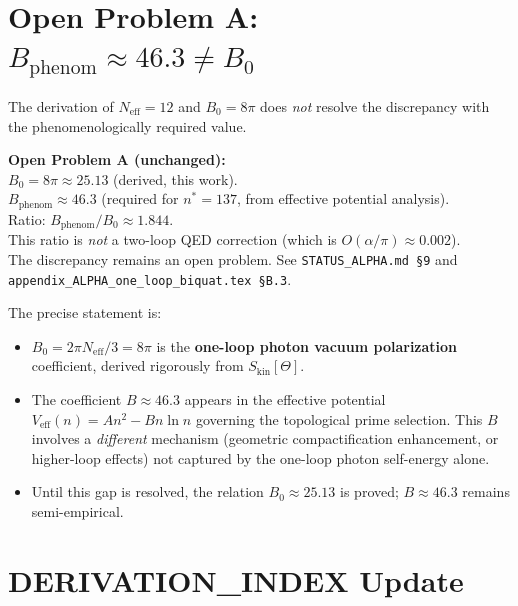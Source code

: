\documentclass[12pt,a4paper]{article}
\theoremstyle{definition}
\theoremstyle{remark}
\newcommand{\Neff}{N_{\mathrm{eff}}}
\begin{document}
\section{Open Problem A: $B_\mathrm{phenom} \approx 46.3 \neq B_0$}
\label{sec:open_problem}

The derivation of $\Neff = 12$ and $B_0 = 8\pi$ does \emph{not} resolve
the discrepancy with the phenomenologically required value.

\begin{center}
  \colorbox{openred!15}{%
    \parbox{0.88\textwidth}{%
      \textbf{Open Problem A (unchanged):}\\
      $B_0 = 8\pi \approx 25.13$ (derived, this work).\\
      $B_\mathrm{phenom} \approx 46.3$ (required for $n^* = 137$,
      from effective potential analysis).\\[4pt]
      Ratio: $B_\mathrm{phenom}/B_0 \approx 1.844$.\\[4pt]
      This ratio is \emph{not} a two-loop QED correction
      (which is $O(\alpha/\pi) \approx 0.002$).\\
      The discrepancy remains an open problem.
      See \texttt{STATUS\_ALPHA.md §9} and
      \texttt{appendix\_ALPHA\_one\_loop\_biquat.tex §B.3}.}}
\end{center}

The precise statement is:
\begin{itemize}
  \item $B_0 = 2\pi\Neff/3 = 8\pi$ is the \textbf{one-loop photon vacuum
    polarization} coefficient, derived rigorously from $S_\mathrm{kin}[\Theta]$.
  \item The coefficient $B \approx 46.3$ appears in the effective potential
    $V_\mathrm{eff}(n) = An^2 - Bn\ln n$ governing the topological prime
    selection.  This $B$ involves a \emph{different} mechanism (geometric
    compactification enhancement, or higher-loop effects) not captured by
    the one-loop photon self-energy alone.
  \item Until this gap is resolved, the relation
    $B_0 \approx 25.13$ is proved; $B \approx 46.3$ remains semi-empirical.
\end{itemize}

\section{DERIVATION\_INDEX Update}
\label{sec:index_update}
\end{document}
